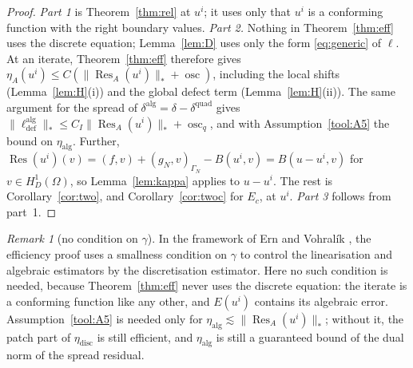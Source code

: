 \documentclass[11pt]{article}
\newcommand{\Res}{\operatorname{Res}}
\newcommand{\osc}{\operatorname{osc}}
\newcommand{\defe}{\mathrm{def}}
\theoremstyle{plain}
\theoremstyle{remark}
\newtheorem{remark}[theorem]{Remark}
\numberwithin{equation}{section}
\begin{document}
\begin{proof}
\emph{Part 1} is Theorem~\ref{thm:rel} at $u^i$; it uses only that $u^i$ is a conforming function
with the right boundary values. \emph{Part 2.} Nothing in Theorem~\ref{thm:eff} uses the discrete
equation; Lemma~\ref{lem:D} uses only the form \eqref{eq:generic} of $\ell$. At an iterate,
Theorem~\ref{thm:eff} therefore gives $\eta_A(u^i)\le C(\|\Res_A(u^i)\|_*+\osc)$, including the
local shifts (Lemma~\ref{lem:H}(i)) and the global defect term (Lemma~\ref{lem:H}(ii)). The same
argument for the spread of $\delta^{\mathrm{alg}}=\delta-\delta^{\mathrm{quad}}$ gives
$\|\ell^{\mathrm{alg}}_\defe\|_*\le C_I\|\Res_A(u^i)\|_*+\osc_q$, and with
Assumption~\ref{tool:A5} the bound on $\eta_{\mathrm{alg}}$. Further,
$\Res(u^i)(v)=(f,v)+(g_N,v)_{\Gamma_N}-B(u^i,v)=B(u-u^i,v)$ for $v\in H^1_D(\Omega)$, so
Lemma~\ref{lem:kappa} applies to $u-u^i$. The rest is Corollary~\ref{cor:two}, and
Corollary~\ref{cor:twoc} for $E_c$, at $u^i$. \emph{Part 3} follows from part~1.
\end{proof}

\begin{remark}[no condition on $\gamma$]
In the framework of Ern and Vohral\'ik \cite{EV13}, the efficiency proof uses a smallness condition
on $\gamma$ to control the linearisation and algebraic estimators by the discretisation estimator.
Here no such condition is needed, because Theorem~\ref{thm:eff} never uses the discrete equation:
the iterate is a conforming function like any other, and $E(u^i)$ contains its algebraic error.
Assumption~\ref{tool:A5} is needed only for $\eta_{\mathrm{alg}}\lesssim\|\Res_A(u^i)\|_*$; without
it, the patch part of $\eta_{\mathrm{disc}}$ is still efficient, and $\eta_{\mathrm{alg}}$ is still a
guaranteed bound of the dual norm of the spread residual.
\end{remark}
\end{document}
